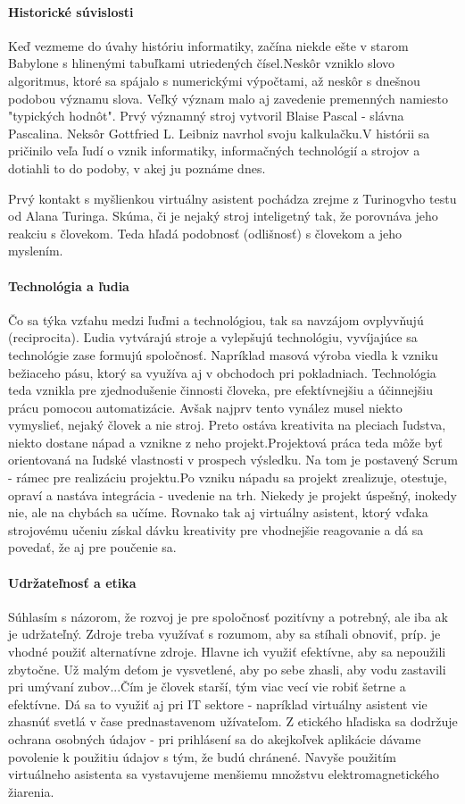 \documentclass[10pt,twoside,slovak,coursepaper]{article}
\begin{document}
\paragraph{Historické súvislosti}
Keď vezmeme do úvahy históriu informatiky, začína niekde ešte v starom Babylone s hlinenými tabuľkami utriedených čísel.Neskôr vzniklo slovo algoritmus, ktoré sa spájalo s numerickými výpočtami, až neskôr s dnešnou podobou významu slova. Veľký význam malo aj zavedenie premenných namiesto "typických hodnôt". Prvý významný stroj vytvoril Blaise Pascal - slávna Pascalina. Neksôr Gottfried L. Leibniz navrhol svoju kalkulačku.V histórii sa pričinilo veľa ľudí o vznik informatiky, informačných technológií a strojov a dotiahli to do podoby, v akej ju poznáme dnes.

 Prvý kontakt s myšlienkou virtuálny asistent pochádza zrejme z Turinogvho testu od Alana Turinga. Skúma, či je nejaký stroj inteligetný tak, že porovnáva jeho reakciu s človekom. Teda hľadá podobnosť (odlišnosť) s človekom a jeho myslením. 
\paragraph{Technológia a ľudia}
Čo sa týka vzťahu medzi ľuďmi a technológiou, tak sa navzájom ovplyvňujú (reciprocita). Ľudia vytvárajú stroje a vylepšujú technológiu, vyvíjajúce sa technológie zase formujú spoločnosť. Napríklad masová výroba viedla k vzniku bežiaceho pásu, ktorý sa využíva aj v obchodoch pri pokladniach. Technológia teda vznikla pre zjednodušenie činnosti človeka, pre efektívnejšiu a účinnejšiu prácu pomocou automatizácie. Avšak najprv tento vynález musel niekto vymyslieť, nejaký človek a nie stroj. Preto ostáva kreativita na pleciach ľudstva, niekto dostane nápad a vznikne z neho projekt.Projektová práca teda môže byť orientovaná na ľudské vlastnosti v prospech výsledku. Na tom je postavený Scrum - rámec pre realizáciu projektu.Po vzniku nápadu sa projekt zrealizuje, otestuje, opraví a nastáva integrácia - uvedenie na trh. Niekedy je projekt úspešný, inokedy nie, ale na chybách sa učíme. Rovnako tak aj virtuálny asistent, ktorý vďaka strojovému učeniu získal dávku kreativity pre vhodnejšie reagovanie a dá sa povedať, že aj pre poučenie sa.
\paragraph{Udržateľnosť a etika}
Súhlasím s názorom, že rozvoj je pre spoločnosť pozitívny a potrebný, ale iba ak je udržateľný. Zdroje treba využívať s rozumom, aby sa stíhali obnoviť, príp. je vhodné použiť alternatívne zdroje. Hlavne ich využiť efektívne, aby sa nepoužili zbytočne. Už malým deťom je vysvetlené, aby po sebe zhasli, aby vodu zastavili pri umývaní zubov...Čím je človek starší, tým viac vecí vie robiť šetrne a efektívne. Dá sa to využiť aj pri IT sektore - napríklad virtuálny asistent vie zhasnúť svetlá v čase prednastavenom užívateľom. Z etického hľadiska sa dodržuje ochrana osobných údajov - pri prihlásení sa do akejkoľvek aplikácie dávame povolenie k použitiu údajov s tým, že budú chránené. Navyše použitím virtuálneho asistenta sa vystavujeme menšiemu množstvu elektromagnetického žiarenia.
\end{document}
